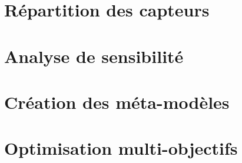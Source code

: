 \documentclass[11pt, oneside]{JeremyThesis}
\begin{document}
\begin{thesisAppendices}

% 

% 
% 

% 

\chapter{Répartition des capteurs} %
\label{cha:repartition_des_capteurs}


\chapter{Analyse de sensibilité} %
\label{cha:analyse_de_sensibilite}


\chapter{Création des méta-modèles} %
\label{cha:creation_des_meta_modeles}


\chapter{Optimisation multi-objectifs} %
\label{cha:optimisation_multi_objectifs}


\end{thesisAppendices}



\thesisPrintbibliography



\end{document}
